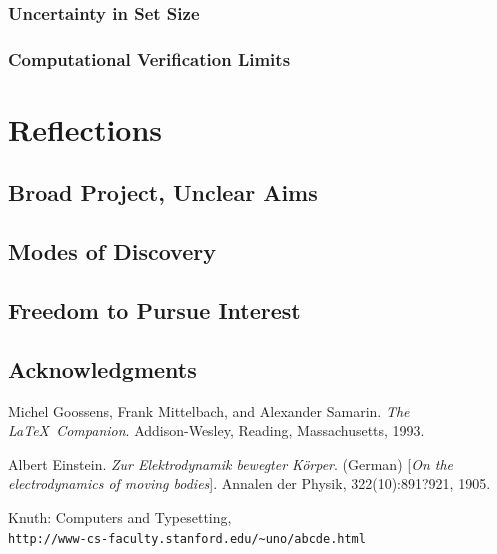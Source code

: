 \documentclass[11pt,a4paper]{report}
\begin{document}
\subsection{Uncertainty in Set Size}
\subsection{Computational Verification Limits}



\chapter{Reflections}
\section{Broad Project, Unclear Aims}
\section{Modes of Discovery}
\section{Freedom to Pursue Interest}
\section{Acknowledgments}





\begin{thebibliography}{9}
Michel Goossens, Frank Mittelbach, and Alexander Samarin. 
\textit{The \LaTeX\ Companion}. 
Addison-Wesley, Reading, Massachusetts, 1993.
 
Albert Einstein. 
\textit{Zur Elektrodynamik bewegter K{\"o}rper}. (German) 
[\textit{On the electrodynamics of moving bodies}]. 
Annalen der Physik, 322(10):891?921, 1905.
 
Knuth: Computers and Typesetting,
\\\texttt{http://www-cs-faculty.stanford.edu/\~{}uno/abcde.html}
\end{thebibliography}
 
\end{document}
